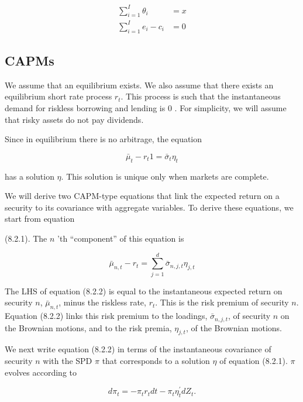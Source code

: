 \documentclass[\topdir/lecture\_notes.tex]{subfiles}
\begin{document}
\begin{equation}
\begin{aligned}
\sum_{i=1}^{I} \theta_{i} & =x \\
\sum_{i=1}^{I} e_{i}-c_{i} & =0
\end{aligned}
\end{equation}

\subsection{CAPMs}
We assume that an equilibrium exists. We also assume that there exists an equilibrium short rate process \(r_{t}\). This process is such that the instantaneous demand for riskless borrowing and lending is 0 . For simplicity, we will assume that risky assets do not pay dividends.

Since in equilibrium there is no arbitrage, the equation

\begin{equation}
\bar{\mu}_{t}-r_{t} 1=\bar{\sigma}_{t} \eta_{t} \label{eq:8.2.1}
\end{equation}

has a solution \(\eta\). This solution is unique only when markets are complete.

We will derive two CAPM-type equations that link the expected return on a security to its covariance with aggregate variables. To derive these equations, we start from equation

(8.2.1). The \(n\) 'th ``component'' of this equation is

\begin{equation}
\bar{\mu}_{n, t}-r_{t}=\sum_{j=1}^{d} \bar{\sigma}_{n, j, t} \eta_{j, t} \label{eq:8.2.2}
\end{equation}

The LHS of equation (8.2.2) is equal to the instantaneous expected return on security \(n\), \(\bar{\mu}_{n, t}\), minus the riskless rate, \(r_{t}\). This is the risk premium of security \(n\). Equation (8.2.2) links this risk premium to the loadings, \(\bar{\sigma}_{n, j, t}\), of security \(n\) on the Brownian motions, and to the risk premia, \(\eta_{j, t}\), of the Brownian motions.

We next write equation (8.2.2) in terms of the instantaneous covariance of security \(n\) with the SPD \(\pi\) that corresponds to a solution \(\eta\) of equation (8.2.1). \(\pi\) evolves according to

\begin{equation}
d \pi_{t}=-\pi_{t} r_{t} d t-\pi_{t} \eta_{t}^{\prime} d Z_{t} .
\end{equation}
\end{document}

